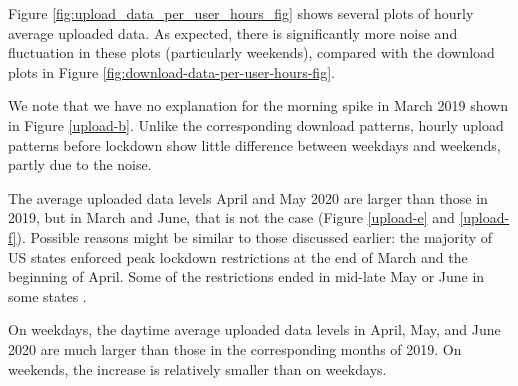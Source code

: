Figure \ref{fig:upload_data_per_user_hours_fig} shows several plots of hourly average uploaded data. As expected, there is significantly more noise and fluctuation in these plots (particularly weekends), compared with the download plots in Figure \ref{fig:download-data-per-user-hours-fig}.

We note that we have no explanation for the morning spike in March 2019 shown in Figure \ref{upload-b}. Unlike the corresponding download patterns, hourly upload patterns before lockdown show little difference between weekdays and weekends, partly due to the noise.

 The average uploaded data levels April and May 2020 are larger than those in 2019, but in March and June, that is not the case (Figure \ref{upload-e} and \ref{upload-f}). Possible reasons might be similar to those discussed earlier: the majority of US states enforced peak lockdown restrictions at the end of March and the beginning of April. Some of the restrictions ended in mid-late May or June in some states \cite{covid19restriction}.

 On weekdays, the daytime average uploaded data levels in April, May, and June 2020 are much larger than those in the corresponding months of 2019. On weekends, the increase is relatively smaller than on weekdays.